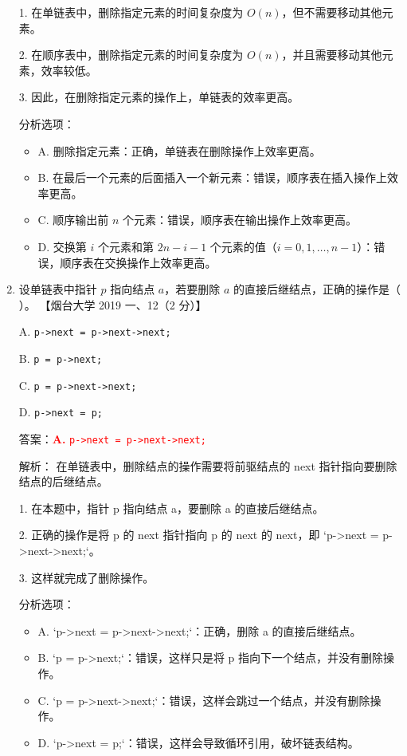 \documentclass[lang=cn,newtx,10pt,scheme=chinese]{../../../elegantbook}
\begin{document}
\begin{enumerate}
        1. 在单链表中，删除指定元素的时间复杂度为 $O(n)$，但不需要移动其他元素。

        2. 在顺序表中，删除指定元素的时间复杂度为 $O(n)$，并且需要移动其他元素，效率较低。

        3. 因此，在删除指定元素的操作上，单链表的效率更高。

        分析选项：
        \begin{itemize}
            \item A. 删除指定元素：正确，单链表在删除操作上效率更高。
            \item B. 在最后一个元素的后面插入一个新元素：错误，顺序表在插入操作上效率更高。
            \item C. 顺序输出前 $n$ 个元素：错误，顺序表在输出操作上效率更高。
            \item D. 交换第 $i$ 个元素和第 $2n-i-1$ 个元素的值（$i=0, 1, \dots, n-1$）：错误，顺序表在交换操作上效率更高。
        \end{itemize}
    
        \item 设单链表中指针 $p$ 指向结点 $a$，若要删除 $a$ 的直接后继结点，正确的操作是（ ）。  
        【烟台大学 2019 一、12（2 分）】  
    
        A. \texttt{p->next = p->next->next;}  
    
        B. \texttt{p = p->next;}  
    
        C. \texttt{p = p->next->next;}  
    
        D. \texttt{p->next = p;}  

        答案：\textcolor{red}{\textbf{A.} \texttt{p->next = p->next->next;}}

        解析：
        在单链表中，删除结点的操作需要将前驱结点的 next 指针指向要删除结点的后继结点。

        1. 在本题中，指针 p 指向结点 a，要删除 a 的直接后继结点。

        2. 正确的操作是将 p 的 next 指针指向 p 的 next 的 next，即 `p->next = p->next->next;`。

        3. 这样就完成了删除操作。

        分析选项：
        \begin{itemize}
            \item A. `p->next = p->next->next;`：正确，删除 a 的直接后继结点。
            \item B. `p = p->next;`：错误，这样只是将 p 指向下一个结点，并没有删除操作。
            \item C. `p = p->next->next;`：错误，这样会跳过一个结点，并没有删除操作。
            \item D. `p->next = p;`：错误，这样会导致循环引用，破坏链表结构。
        \end{itemize}
    

\end{enumerate}
\end{document}
